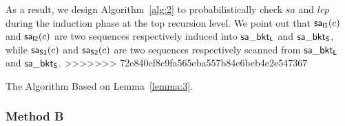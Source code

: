 \documentclass[10pt,journal,compsoc]{IEEEtran}
\begin{document}
As a result, we design Algorithm~\ref{alg:2} to probabilistically check $sa$ and $lcp$ during the induction phase at the top recursion level. We point out that ${\sf sa_{I1}}(c)$ and ${\sf sa_{I2}}(c)$ are two sequences respectively induced into ${\sf sa\_bkt_L}$ and ${\sf sa\_bkt_S}$, while ${\sf sa_{S1}}(c)$ and ${\sf sa_{S2}}(c)$ are two sequences respectively scanned from ${\sf sa\_bkt_L}$ and ${\sf sa\_bkt_S}$.
>>>>>>> 72e840cf8c9fa565eba557b84e6beb4e2e547367



\begin{algorithm*}

	\caption{The Algorithm Based on Lemma~\ref{lemma:3}.}
	
	\label{alg:2}
	
	\end{algorithm*}


\subsubsection{Method B}\label{sec:proposals:method_b}
\end{document}
